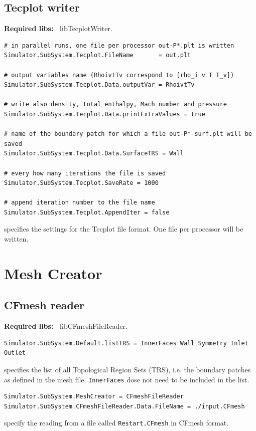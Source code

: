 \documentclass[11pt]{article}
\begin{document}
\subsection{Tecplot writer}

{\bf Required libs:~} libTecplotWriter.
        
\begin{verbatim}
# in parallel runs, one file per processor out-P*.plt is written
Simulator.SubSystem.Tecplot.FileName       = out.plt

# output variables name (RhoivtTv correspond to [rho_i v T T_v])
Simulator.SubSystem.Tecplot.Data.outputVar = RhoivtTv

# write also density, total enthalpy, Mach number and pressure
Simulator.SubSystem.Tecplot.Data.printExtraValues = true  

# name of the boundary patch for which a file out-P*-surf.plt will be saved   
Simulator.SubSystem.Tecplot.Data.SurfaceTRS = Wall   

# every how many iterations the file is saved  
Simulator.SubSystem.Tecplot.SaveRate = 1000

# append iteration number to the file name
Simulator.SubSystem.Tecplot.AppendIter = false       
\end{verbatim}
specifies the settings for the Tecplot file format. One file per processor will be written. 

\section{Mesh Creator}

\subsection{CFmesh reader}

{\bf Required libs:~} libCFmeshFileReader.

\begin{verbatim}
Simulator.SubSystem.Default.listTRS = InnerFaces Wall Symmetry Inlet Outlet
\end{verbatim}
specifies the list of all Topological Region Sets (TRS), i.e. the boundary patches as defined in the mesh file.
{\tt InnerFaces} dose not need to be included in the list.

\begin{verbatim}
Simulator.SubSystem.MeshCreator = CFmeshFileReader
Simulator.SubSystem.CFmeshFileReader.Data.FileName = ./input.CFmesh
\end{verbatim}
specify the reading from a file called {\tt Restart.CFmesh} in CFmesh format. 
\end{document}
